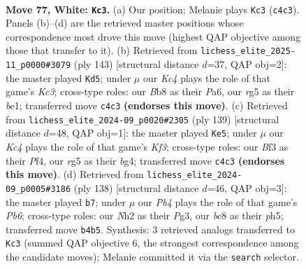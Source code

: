 \documentclass[11pt]{article}
\begin{document}
\clearpage

\begin{figure}[p]\centering
\begin{subfigure}{0.46\textwidth}\centering
\resizebox{\linewidth}{!}{%
\newchessgame
\chessboard[
  setfen={1Bb2k2/8/8/6r1/PPK5/5B1p/1R5N/8 w - - 11 77},
  showmover=false,
  pgfstyle=straightmove, color=movearrow, markmove={c4-c3}
]}
\caption{}
\end{subfigure}\hfill
\begin{subfigure}{0.46\textwidth}\centering
\resizebox{\linewidth}{!}{%
\newchessgame
\chessboard[
  setfen={8/8/p1kn1K2/P1p5/2b5/8/7R/4B3 b - - 22 72},
  showmover=false,
  pgfstyle=straightmove, color=movearrow, markmove={c6-d5}
]}
\caption{}
\end{subfigure}
\\[4pt]
\begin{subfigure}{0.46\textwidth}\centering
\resizebox{\linewidth}{!}{%
\newchessgame
\chessboard[
  setfen={8/8/1r1b1kp1/8/5pB1/4pP2/2R3K1/8 b - - 1 70},
  showmover=false,
  pgfstyle=straightmove, color=movearrow, markmove={f6-e5}
]}
\caption{}
\end{subfigure}\hfill
\begin{subfigure}{0.46\textwidth}\centering
\resizebox{\linewidth}{!}{%
\newchessgame
\chessboard[
  setfen={3k4/8/1P1BB3/1K4pp/8/6P1/8/2r5 w - - 5 70},
  showmover=false,
  pgfstyle=straightmove, color=movearrow, markmove={b6-b7}
]}
\caption{}
\end{subfigure}
\caption{\textbf{Move 77, White: \texttt{Kc3}.} (a) Our position; Melanie plays \texttt{Kc3} (\texttt{c4c3}). Panels (b)--(d) are the retrieved master positions whose correspondence most drove this move (highest QAP objective among those that transfer to it). (b) Retrieved from \texttt{lichess\_elite\_2025-11\_p0000\#3079} (ply 143) [structural distance $d$=37, QAP obj=2]: the master played \texttt{Kd5}; under $\mu$ our \emph{Kc4} plays the role of that game's \emph{Kc3}; cross-type roles: our \emph{B}b8 as their \emph{P}a6, our \emph{r}g5 as their \emph{b}e1; transferred move \texttt{c4c3} \textbf{(endorses this move)}. (c) Retrieved from \texttt{lichess\_elite\_2024-09\_p0020\#2305} (ply 139) [structural distance $d$=48, QAP obj=1]: the master played \texttt{Ke5}; under $\mu$ our \emph{Kc4} plays the role of that game's \emph{Kf3}; cross-type roles: our \emph{B}f3 as their \emph{P}f4, our \emph{r}g5 as their \emph{b}g4; transferred move \texttt{c4c3} \textbf{(endorses this move)}. (d) Retrieved from \texttt{lichess\_elite\_2024-09\_p0005\#3186} (ply 138) [structural distance $d$=46, QAP obj=3]: the master played \texttt{b7}; under $\mu$ our \emph{Pb4} plays the role of that game's \emph{Pb6}; cross-type roles: our \emph{N}h2 as their \emph{P}g3, our \emph{b}c8 as their \emph{p}h5; transferred move \texttt{b4b5}. Synthesis: 3 retrieved analogs transferred to \texttt{Kc3} (summed QAP objective 6, the strongest correspondence among the candidate moves); Melanie committed it via the \texttt{search} selector.}
\label{fig:thought-m152}
\end{figure}
\end{document}
